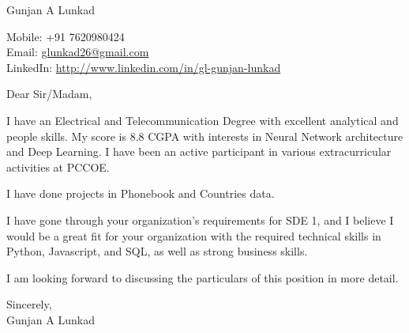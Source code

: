 \documentclass[a4paper,12pt]{letter}
\begin{document}
\begin{letter}{}

    \begin{center}
        Gunjan A Lunkad
    \end{center}

    \begin{flushright}
        Mobile: +91 7620980424 \\
        Email: \href{mailto:glunkad26@gmail.com}{glunkad26@gmail.com} \\
        LinkedIn: \href{http://www.linkedin.com/in/gl-gunjan-lunkad}{http://www.linkedin.com/in/gl-gunjan-lunkad}
    \end{flushright}

    \opening{Dear Sir/Madam,}

    I have an Electrical and Telecommunication Degree with excellent analytical and people skills. My score is 8.8 CGPA with interests in Neural Network architecture and Deep Learning. I have been an active participant in various extracurricular activities at PCCOE.

    I have done projects in Phonebook and Countries data.

    I have gone through your organization's requirements for SDE 1, and I believe I would be a great fit for your organization with the required technical skills in Python, Javascript, and SQL, as well as strong business skills.

    I am looking forward to discussing the particulars of this position in more detail.

    \closing{Sincerely, \\ Gunjan A Lunkad }
    \vspace{2cm}  %


\end{letter}
\end{document}
